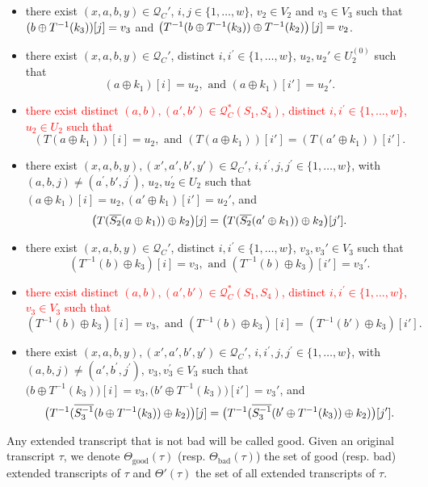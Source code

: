 \begin{definition}
\begin{itemize}[leftmargin=10mm]
	\item[\bseven]
	there exist $(x,a,b,y) \in \mathcal{Q}_{C}'$, $i, j \in\{1, \ldots, w\}$, $v_{2} \in V_{2}$ and $v_{3} \in V_{3}$ such that $(b\oplus T^{-1}(k_3))[j] = v_3$ and $\left(T^{-1}(b\oplus T^{-1}(k_3)) \oplus T^{-1}(k_2)\right)[j] = v_2$.
	\item[\beight]
	there exist $(x,a,b,y) \in \mathcal{Q}_{C}'$, distinct $i, i^{\prime}\in\{1, \ldots, w\}$, $u_{2},u_{2}' \in U_{2}^{(0)}$ such that
	$$(a \oplus k_1)[i] = u_2,\text{ and }
	(a \oplus k_1)[i'] = u_2'.$$
	\item[\cfive] \textcolor{red}{there exist distinct $(a, b),(a',b') \in \mathcal{Q}_{C}^{*}\left(S_{1}, S_{4}\right)$, distinct $i, i^{\prime}\in\{1, \ldots, w\}$, $u_{2} \in U_{2}$ such that}
	$$\left(T\left(a \oplus k_{1}\right)\right)[i] = u_2,\text{ and }
	\left(T\left(a \oplus k_{1}\right)\right)[i'] = \left(T\left(a' \oplus k_{1}\right)\right)[i'].$$
	\item[\bnine]
	there exist $(x,a,b,y),(x',a',b',y') \in \mathcal{Q}_{C}'$, $i, i^{\prime},j, j^{\prime} \in\{1, \ldots, w\}$, with $(a,b, j) \neq \left(a^{\prime}, b',j^{\prime}\right)$, $u_{2}, u_{2}^{\prime} \in U_{2}$ such that $(a \oplus k_1)[i] = u_2, (a' \oplus k_1)[i'] = u_2'$, and
	$$\big(T(\overline{S_2}(a\oplus k_1))\oplus k_2\big)[j]=\big(T(\overline{S_2}(a'\oplus k_1))\oplus k_2\big)[j'].
	$$
	\item[\bten]
	there exist $(x,a,b,y) \in \mathcal{Q}_{C}'$, distinct $i, i^{\prime}\in\{1, \ldots, w\}$, $v_{3},v_{3}' \in V_{3}$ such that
	$$\left(T^{-1}\left(b\right) \oplus k_{3}\right)[i] = v_3,\text{ and }
	\left(T^{-1}\left(b\right) \oplus k_{3}\right)[i'] = v_3'.$$
	\item[\ceight]
	\textcolor{red}{there exist distinct $(a, b),(a',b') \in \mathcal{Q}_{C}^{*}\left(S_{1}, S_{4}\right)$, distinct $i, i^{\prime}\in\{1, \ldots, w\}$, $v_{3} \in V_{3}$ such that}
	$$\left(T^{-1}\left(b\right) \oplus k_{3}\right)[i] = v_3,\text{ and }
	\left(T^{-1}\left(b\right) \oplus k_{3}\right)[i] =\left(T^{-1}\left(b'\right) \oplus k_{3}\right)[i'].$$
	\item[\beleven]
	there exist $(x,a,b,y),(x',a',b',y') \in \mathcal{Q}_{C}'$, $i, i^{\prime}, j, j^{\prime} \in\{1, \ldots, w\}$, with $(a,b, j) \neq \left(a',b^{\prime}, j^{\prime}\right)$, $v_{3},v_{3}^{\prime} \in V_{3}$ such that $\big(b \oplus T^{-1}(k_3)\big)[i] = v_3, \big(b' \oplus T^{-1}(k_3)\big)[i'] = v_3'$, and
	$$\big(T^{-1}(\overline{S_3^{-1}}(b \oplus T^{-1}(k_3))\oplus k_2)\big)[j]=\big(T^{-1}(\overline{S_3^{-1}}(b' \oplus T^{-1}(k_3))\oplus k_2)\big)[j'].
	$$
\end{itemize}
Any extended transcript that is not bad will be called good. Given an original transcript $\tau$, we denote $\Theta_{\mathrm{good}}(\tau)$ (resp. $\Theta_{\mathrm{bad}}(\tau)$) the set of good (resp. bad) extended transcripts of $\tau$ and $\Theta'(\tau)$ the set of all extended transcripts of $\tau$.
\end{definition}





